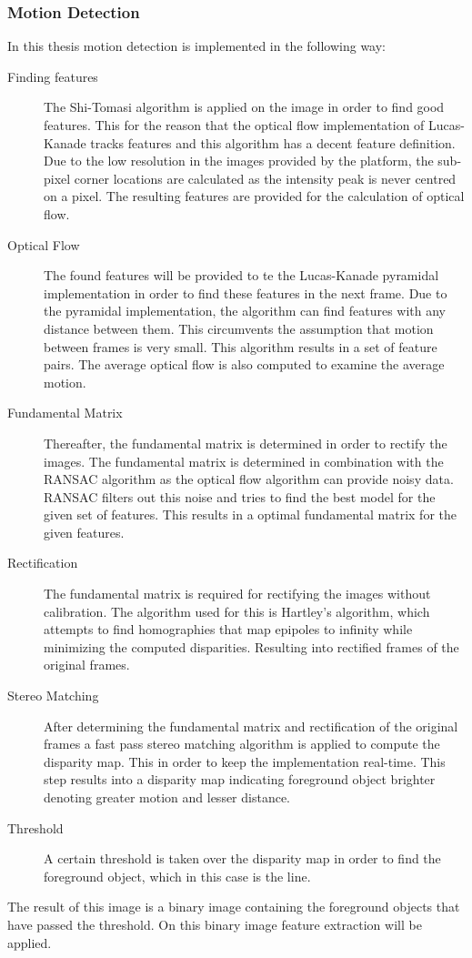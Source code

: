 \documentclass[a4paper]{article}
\begin{document}
\subsubsection{Motion Detection}
In this thesis motion detection is implemented in the following way:
\begin{description}
\item[Finding features] The Shi-Tomasi algorithm \cite{Shi1994} is applied on the image in order to find good features. This for the reason that the optical flow implementation of Lucas-Kanade tracks features and this algorithm has a decent feature definition. Due to the low resolution in the images provided by the platform, the sub-pixel corner locations are calculated as the intensity peak is never centred on a pixel. The resulting features are provided for the calculation of optical flow.

\item[Optical Flow] The found features will be provided to te the Lucas-Kanade pyramidal implementation in order to find these features in the next frame. Due to the pyramidal implementation, the algorithm can find features with any distance between them. This circumvents the assumption that motion between frames is very small. This algorithm results in a set of feature pairs. The average optical flow is also computed to examine the average motion.

\item[Fundamental Matrix] Thereafter, the fundamental matrix is determined in order to rectify the images. The fundamental matrix is determined in combination with the RANSAC algorithm as the optical flow algorithm can provide noisy data. RANSAC filters out this noise and tries to find the best model for the given set of features. This results in a optimal fundamental matrix for the given features.

\item[Rectification] The fundamental matrix is required for rectifying the images without calibration. The algorithm used for this is Hartley's algorithm, which attempts to find homographies that map epipoles to infinity while minimizing the computed disparities. Resulting into rectified frames of the original frames.

\item[Stereo Matching] After determining the fundamental matrix and rectification of the original frames a fast pass stereo matching algorithm \cite{Gutmann2000} is applied to compute the disparity map. This in order to keep the implementation real-time. This step results into a disparity map indicating foreground object brighter denoting greater motion and lesser distance.

\item[Threshold] A certain threshold is taken over the disparity map in order to find the foreground object, which in this case is the line.
\end{description}
The result of this image is a binary image containing the foreground objects that have passed the threshold. On this binary image feature extraction will be applied.
\end{document}
